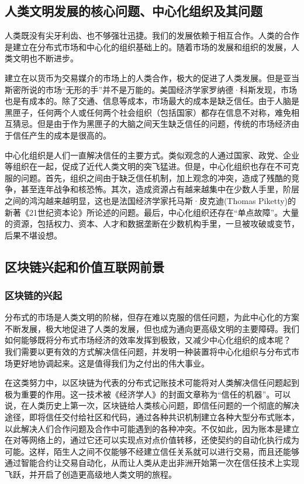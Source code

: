 \documentclass[a4paper,12pt]{article}
\begin{document}
\subsection{人类文明发展的核心问题、中心化组织及其问题}

人类既没有尖牙利齿、也不够强壮迅捷。我们的发展依赖于相互合作。人类的合作是建立在分布式市场和中心化的组织基础上的。随着市场的发展和组织的发展，人类文明也不断进步。

建立在以货币为交易媒介的市场上的人类合作，极大的促进了人类发展。但是亚当斯密所说的市场“无形的手”并不是万能的。美国经济学家罗纳德·科斯\citep{coase1937nature}发现，市场也是有成本的。除了交通、信息等成本，市场最大的成本是缺乏信任。由于人脑是黑匣子，任何两个人或任何两个社会组织（包括国家）都存在信息不对称，难免相互猜忌。但是由于作为黑匣子的大脑之间天生缺乏信任的问题，传统的市场经济由于信任产生的成本是很高的。

中心化组织是人们一直解决信任的主要方式。类似观念的人通过国家、政党、企业等组织在一起，促成了近代人类文明的突飞猛进。但是，中心化组织也存在不可克服的问题。首先，组织之间由于缺乏信任机制，加上观念的冲突，造成了残酷的竞争，甚至连年战争和核恐怖。其次，造成资源占有越来越集中在少数人手里，阶层之间的鸿沟越来越明显，这也是法国经济学家托马斯·皮克迪(Thomas Piketty)的新著《21世纪资本论》所论述的问题。最后，中心化组织还存在“单点故障”。大量的资源，包括权力、资本、人才和数据垄断在少数机构手里，一旦被攻破或变节，后果不堪设想。

\subsection{区块链兴起和价值互联网前景}

\subsubsection{区块链的兴起}

分布式的市场是人类文明的阶梯，但存在难以克服的信任问题，为此中心化的方案不断发展，极大地促进了人类的发展，但也成为通向更高级文明的主要障碍。我们如何能够既将分布式市场经济的效率发挥到极致，又减少中心化组织的成本呢？ 我们需要以更有效的方式解决信任问题，并发明一种装置将中心化组织与分布式市场更好地协调起来。这是值得我们为之付出的伟大事业。

在这类努力中，以区块链为代表的分布式记账技术可能将对人类解决信任问题起到极为重要的作用。这一技术被《经济学人》的封面文章称为“信任的机器”。可以说，在人类历史上第一次，区块链给人类核心问题，即信任问题的一个彻底的解决途径，即将信任交付给社区和代码，通过各种共识机制建立各种大型分布式账本，以此解决人们合作问题及合作中可能遇到的各种冲突。不仅如此，因为账本是建立在对等网络上的，通过它还可以实现点对点价值转移，还使契约的自动化执行成为可能。这样，陌生人之间不仅能够不经建立信任关系就可以进行交易，而且还能够通过智能合约让交易自动化，从而让人类从走出非洲开始第一次在信任技术上实现飞跃，并开启了创造更高级地人类文明的旅程。
\end{document}
